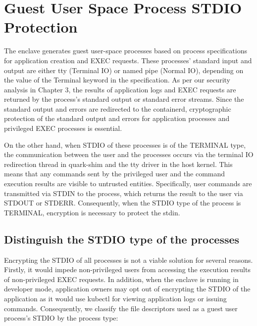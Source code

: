 \section{Guest User Space Process STDIO Protection}
\label{sec:design_STDIO_PROTECTION}
The enclave generates guest user-space processes based on process specifications for application creation and EXEC requests. These processes' standard input and output are either tty (Terminal IO) or named pipe (Normal IO), depending on the value of 
the Terminal keyword in the specification. As per our security analysis in Chapter 3, the results of application logs and EXEC requests are returned by the process's standard output or standard error streams. Since the standard output and errors 
are redirected to the containerd, cryptographic protection of the standard output and errors for application processes and privileged EXEC processes is essential.

On the other hand, when STDIO of these processes is of the TERMINAL type, the communication between the user and the processes occurs via the terminal IO redirection thread in quark-shim and the tty driver in the host kernel. This means that any 
commands sent by the privileged user and the command execution results are visible to untrusted entities. Specifically, user commands are transmitted via STDIN to the process, which returns the result to the user via STDOUT or STDERR. Consequently, 
when the STDIO type of the process is TERMINAL, encryption is necessary to protect the stdin.

\subsection{Distinguish the STDIO type of the processes}
Encrypting the STDIO of all processes is not a viable solution for several reasons. Firstly, it would impede non-privileged users from accessing the execution results of non-privileged EXEC requests. In addition, when the enclave is running in 
developer mode, application owners may opt out of encrypting the STDIO of the application as it would use kubectl for viewing application logs or issuing commands. Consequently, we classify the file descriptors used as a guest user process's STDIO 
by the process type:

